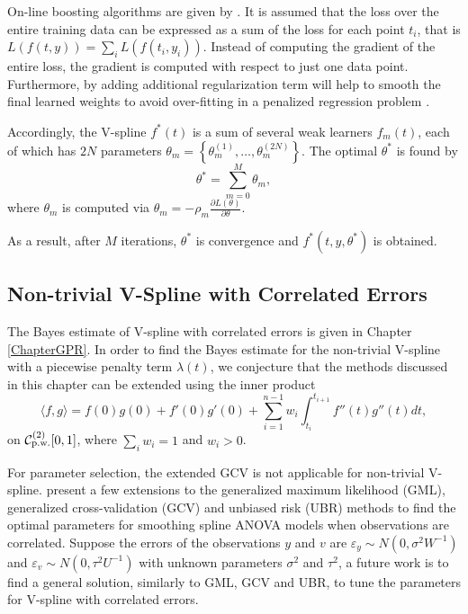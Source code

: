 On-line boosting algorithms are given by \cite{babenko2009family, beygelzimer2015online}. It is assumed that the loss over the entire training data can be expressed as a sum of the loss for each point $t_i$, that is $L(f(t,y))=\sum_i L(f(t_i,y_i))$. Instead of computing the gradient of the entire loss, the gradient is computed with respect to just one data point. Furthermore, by adding additional regularization term will help to smooth the final learned weights to avoid over-fitting in a penalized regression problem \citep{chen2016xgboost}. 

Accordingly, the V-spline $f^*(t)$ is a sum of several weak learners $f_m(t)$, each of which has $2N$ parameters $\theta_m=\left\lbrace \theta_m^{(1)},\ldots,\theta_m^{(2N)}\right\rbrace$. The optimal $\theta^*$ is found by 
\begin{equation*}
\theta^*=\sum_{m=0}^{M}\theta_m,
\end{equation*}
where $\theta_m$ is computed via $\theta_m=-\rho_m\frac{\partial L(\theta)}{\partial \theta}$. 

As a result, after $M$ iterations, $\theta^*$ is convergence and $f^*(t,y,\theta^*)$ is obtained. 



\subsection*{Non-trivial V-Spline with Correlated Errors}

The Bayes estimate of V-spline with correlated errors is given in Chapter \ref{ChapterGPR}. In order to find the Bayes estimate for the non-trivial V-spline with a piecewise penalty term $\lambda(t)$, we conjecture that the methods discussed in this chapter can be extended using the inner product 
\begin{equation*}
\langle f,g \rangle=f(0) g(0)+f'(0) g'(0)+\sum_{i=1}^{n-1}w_i\int_{t_i}^{t_{i+1}}f''(t)g''(t)dt,
\end{equation*}
on $\mathcal{C}^{(2)}_{\mbox{\scriptsize p.w.}}[0,1]$, where $\sum_i w_i=1$ and $w_i>0$. 

For parameter selection, the extended GCV is not applicable for non-trivial V-spline. \cite{opsomer2001nonparametric, wang1998smoothing} present a few extensions to the generalized maximum likelihood (GML), generalized cross-validation (GCV) and unbiased risk (UBR) methods to find the optimal parameters for smoothing spline ANOVA models when observations are correlated. Suppose the errors of the observations $y$ and $v$ are $\varepsilon_y\sim N\left(0,\sigma^2W^{-1}\right)$ and $\varepsilon_v\sim N\left(0,\tau^2U^{-1}\right)$ with unknown parameters $\sigma^2$ and $\tau^2$, a future work is to find a general solution, similarly to GML, GCV and UBR, to tune the parameters for V-spline with correlated errors.  



